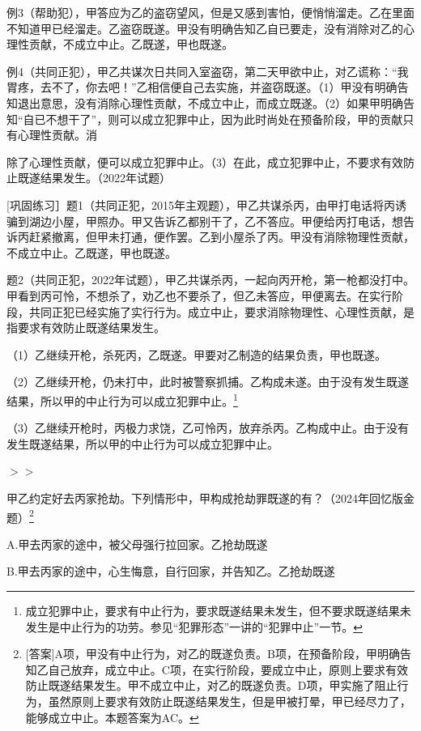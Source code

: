 例3（帮助犯），甲答应为乙的盗窃望风，但是又感到害怕，便悄悄溜走。乙在里面不知道甲已经溜走。乙盗窃既遂。甲没有明确告知乙自已要走，没有消除对乙的心理性贡献，不成立中止。乙既遂，甲也既遂。

例4（共同正犯），甲乙共谋次日共同入室盗窃，第二天甲欲中止，对乙谎称：“我胃疼，去不了，你去吧！”乙相信便自己去实施，并盗窃既遂。（1）甲没有明确告知退出意思，没有消除心理性贡献，不成立中止，而成立既遂。（2）如果甲明确告知“自已不想干了”，则可以成立犯罪中止，因为此时尚处在预备阶段，甲的贡献只有心理性贡献。消

除了心理性贡献，便可以成立犯罪中止。（3）在此，成立犯罪中止，不要求有效防止既遂结果发生。（2022年试题）

[巩固练习］题1（共同正犯，2015年主观题），甲乙共谋杀丙，由甲打电话将丙诱骗到湖边小屋，甲照办。甲又告诉乙都别干了，乙不答应。甲便给丙打电话，想告诉丙赶紧撤离，但甲未打通，便作罢。乙到小屋杀了丙。甲没有消除物理性贡献，不成立中止。乙既遂，甲也既遂。

题2（共同正犯，2022年试题），甲乙共谋杀丙，一起向丙开枪，第一枪都没打中。甲看到丙可怜，不想杀了，劝乙也不要杀了，但乙未答应，甲便离去。在实行阶段，共同正犯已经实施了实行行为。成立中止，要求消除物理性、心理性贡献，是指要求有效防止既遂结果发生。

（1）乙继续开枪，杀死丙，乙既遂。甲要对乙制造的结果负责，甲也既遂。

（2）乙继续开枪，仍未打中，此时被警察抓捕。乙构成未遂。由于没有发生既遂结果，所以甲的中止行为可以成立犯罪中止。\footnote{成立犯罪中止，要求有中止行为，要求既遂结果未发生，但不要求既遂结果未发生是中止行为的功劳。参见“犯罪形态”一讲的“犯罪中止”一节。}

（3）乙继续开枪时，丙极力求饶，乙可怜丙，放弃杀丙。乙构成中止。由于没有发生既遂结果，所以甲的中止行为可以成立犯罪中止。


\ensuremath{>}\ensuremath{>}

甲乙约定好去丙家抢劫。下列情形中，甲构成抢劫罪既遂的有？（2024年回忆版金题）\footnote{[答案]A项，甲没有中止行为，对乙的既遂负责。B项，在预备阶段，甲明确告知乙自己放弃，成立中止。C项，在实行阶段，要成立中止，原则上要求有效防止既遂结果发生。甲不成立中止，对乙的既遂负责。D项，甲实施了阻止行为，虽然原则上要求有效防止既遂结果发生，但是甲被打晕，甲已经尽力了，能够成立中止。本题答案为AC。}

A.甲去丙家的途中，被父母强行拉回家。乙抢劫既遂

B.甲去丙家的途中，心生悔意，自行回家，并告知乙。乙抢劫既遂

